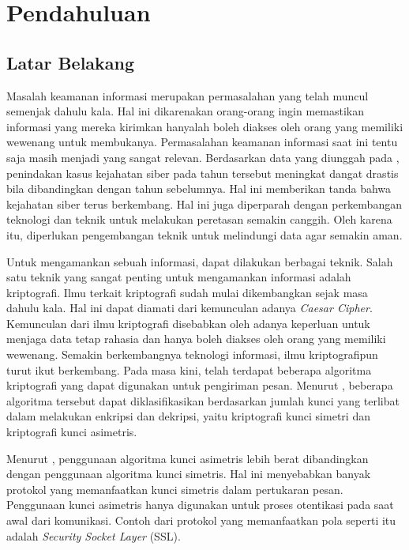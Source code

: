 \chapter{Pendahuluan}

\section{Latar Belakang}
Masalah keamanan informasi merupakan permasalahan yang telah muncul semenjak dahulu kala. Hal ini dikarenakan orang-orang ingin memastikan informasi yang mereka kirimkan hanyalah boleh diakses oleh orang yang memiliki wewenang untuk membukanya. Permasalahan keamanan informasi saat ini tentu saja masih menjadi yang sangat relevan. Berdasarkan data yang diunggah pada \textcite{pusiknaspolri_cybercrime_2022}, penindakan kasus kejahatan siber pada tahun tersebut meningkat dangat drastis bila dibandingkan dengan tahun sebelumnya. Hal ini memberikan tanda bahwa kejahatan siber terus berkembang. Hal ini juga diperparah dengan perkembangan teknologi dan teknik untuk melakukan peretasan semakin canggih. Oleh karena itu, diperlukan pengembangan teknik untuk melindungi data agar semakin aman.

Untuk mengamankan sebuah informasi, dapat dilakukan berbagai teknik. Salah satu teknik yang sangat penting untuk mengamankan informasi adalah kriptografi. Ilmu terkait kriptografi sudah mulai dikembangkan sejak masa dahulu kala. Hal ini dapat diamati dari kemunculan adanya \emph{Caesar Cipher}. Kemunculan dari ilmu kriptografi disebabkan oleh adanya keperluan untuk menjaga data tetap rahasia dan hanya boleh diakses oleh orang yang memiliki wewenang. Semakin berkembangnya teknologi informasi, ilmu kriptografipun turut ikut berkembang. Pada masa kini, telah terdapat beberapa  algoritma kriptografi yang dapat digunakan untuk pengiriman pesan. Menurut \textcite{munir2019}, beberapa algoritma tersebut dapat diklasifikasikan berdasarkan jumlah kunci yang terlibat dalam melakukan enkripsi dan dekripsi, yaitu kriptografi kunci simetri dan kriptografi kunci asimetris.

Menurut \textcite{halak2022}, penggunaan algoritma kunci asimetris lebih berat dibandingkan dengan penggunaan algoritma kunci simetris. Hal ini menyebabkan banyak protokol yang memanfaatkan kunci simetris dalam pertukaran pesan. Penggunaan kunci asimetris hanya digunakan untuk proses otentikasi pada saat awal dari komunikasi. Contoh dari protokol yang memanfaatkan pola seperti itu adalah \emph{Security Socket Layer} (SSL).

